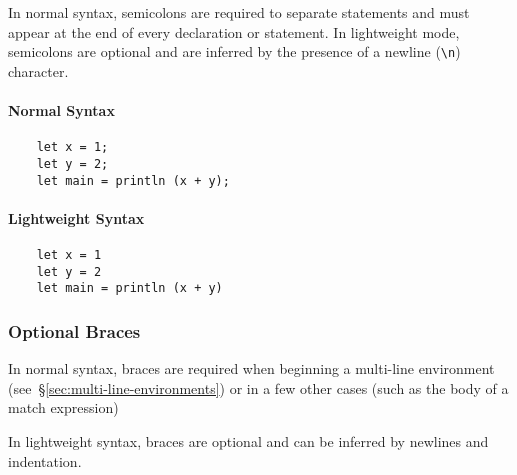\documentclass{article}
\begin{document}
In normal syntax, semicolons are required to separate statements and must appear at the end of every declaration or statement. In lightweight mode, semicolons are optional and are inferred by the presence of a newline (\verb|\n|) character.

\begin{paracol}{2}
    \paragraph{Normal Syntax}
    \begin{verbatim}
    let x = 1;
    let y = 2;
    let main = println (x + y);
    \end{verbatim}

    \switchcolumn{}
    \paragraph{Lightweight Syntax}
    \begin{verbatim}
    let x = 1
    let y = 2
    let main = println (x + y)
    \end{verbatim}
\end{paracol}


\subsubsection*{Optional Braces}

In normal syntax, braces are required when beginning a multi-line environment (see~§\ref{sec:multi-line-environments})
or in a few other cases (such as the body of a match expression)

In lightweight syntax, braces are optional and can be inferred by newlines and indentation.
\end{document}
